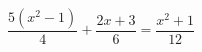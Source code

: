 \begin{ex}
	\begin{condition}
		\( \dfrac{5(x^2-1)}{4}+\dfrac{2x+3}{6}=\dfrac{x^2+1}{12} \)
	\end{condition}
\end{ex}